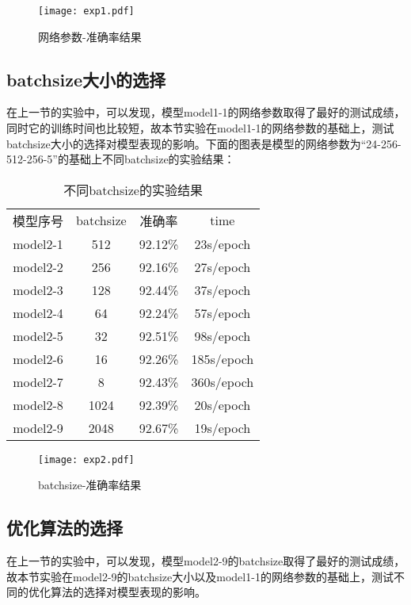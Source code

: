 \begin{figure}[H]
    \centering
    \texttt{[image: exp1.pdf]}
    \caption{网络参数-准确率结果}
    \label{fig:exp1-2}
\end{figure}

\subsection{batchsize大小的选择}

在上一节的实验中，可以发现，模型model1-1的网络参数取得了最好的测试成绩，同时它的训练时间也比较短，故本节实验在model1-1的网络参数的基础上，测试batchsize大小的选择对模型表现的影响。下面的图表是模型的网络参数为“24-256-512-256-5”的基础上不同batchsize的实验结果：
\begin{table}[htbp]
	\centering
	\caption{不同batchsize的实验结果}
	\begin{tabular}{cccc}
		模型序号 & batchsize & 准确率  & time       \\
		model2-1  & 512       & 92.12\% & 23s/epoch  \\
		model2-2  & 256       & 92.16\% & 27s/epoch  \\
		model2-3  & 128       & 92.44\% & 37s/epoch  \\
		model2-4  & 64        & 92.24\% & 57s/epoch  \\
		model2-5  & 32        & 92.51\% & 98s/epoch  \\
		model2-6  & 16        & 92.26\% & 185s/epoch \\
		model2-7  & 8         & 92.43\% & 360s/epoch \\
		model2-8  & 1024      & 92.39\% & 20s/epoch  \\
		model2-9  & 2048      & 92.67\% & 19s/epoch  \\
	\end{tabular}%
	\label{tab:exp2-1}%
\end{table}%

\begin{figure}[H]
    \centering
    \texttt{[image: exp2.pdf]}
    \caption{batchsize-准确率结果}
    \label{fig:exp2-2}
\end{figure}

\subsection{优化算法的选择}

在上一节的实验中，可以发现，模型model2-9的batchsize取得了最好的测试成绩，故本节实验在model2-9的batchsize大小以及model1-1的网络参数的基础上，测试不同的优化算法的选择对模型表现的影响。

